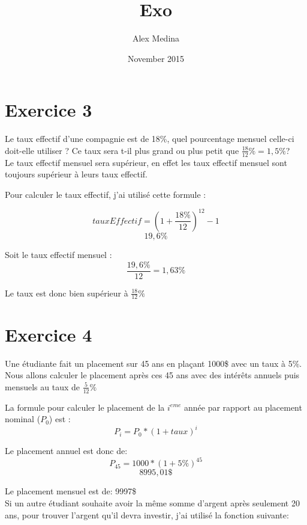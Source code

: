 \documentclass{article}
\title{Exo}
\author{Alex Medina }
\date{November 2015}
\begin{document}
\maketitle
\section{Exercice 3}
\qquad Le taux effectif d'une compagnie est de 18\%, quel pourcentage mensuel celle-ci doit-elle utiliser ? Ce taux sera t-il plus grand ou plus petit que $\frac{18}{12}\% = 1,5\%$?
\\

\qquad Le taux effectif mensuel sera supérieur, en effet les taux effectif mensuel sont toujours supérieur à leurs taux effectif.

\qquad Pour calculer le taux effectif, j'ai utilisé cette formule :

$$tauxEffectif=(1+\frac{18\%}{12})^{12}-1$$
$$19,6\%$$

\qquad Soit le taux effectif mensuel : 
$$\frac{19,6\%}{12}=1,63\%$$

\qquad Le taux est donc bien supérieur à $\frac{18}{12}\%$

\section{Exercice 4}
\qquad Une étudiante fait un placement sur 45 ans en plaçant 1000\$ avec un taux à 5\%. Nous allons calculer le placement après ces 45 ans avec des intérêts annuels puis mensuels au taux de $\frac{5}{12}\%$

\qquad La formule pour calculer le placement de la $ i^{eme}$ année par rapport au placement nominal ($P_0$) est :
$$P_i = P_0 * (1+taux)^i$$

\qquad Le placement annuel est donc de:
$$P_{45} = 1000 * (1+5\%)^{45}$$
$$8995,01\$ $$

\qquad Le placement mensuel est de: 9997\$
\\

\qquad Si un autre étudiant souhaite avoir la même somme d'argent après seulement 20 ans, pour trouver l'argent qu'il devra investir, j'ai utilisé la fonction suivante:


\newsavebox{\BBbox}
\newenvironment{DDbox}[1]{
\begin{lrbox}{\BBbox}\begin{minipage}{\linewidth}}
{\end{minipage}\end{lrbox}\noindent\colorbox{Zgris}{\usebox{\BBbox}} \\
[.5cm]}
\end{document}
